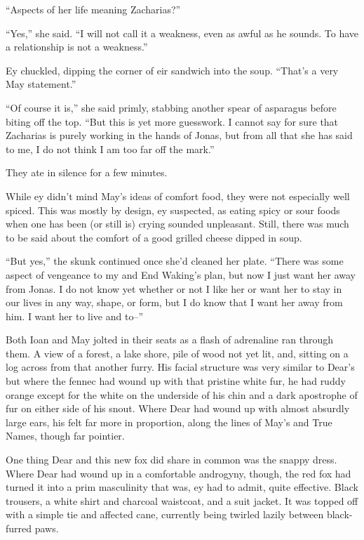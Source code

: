 ``Aspects of her life meaning Zacharias?''

``Yes,'' she said. ``I will not call it a weakness, even as awful as he sounds. To have a relationship is not a weakness.''

Ey chuckled, dipping the corner of eir sandwich into the soup. ``That's a very May statement.''

``Of course it is,'' she said primly, stabbing another spear of asparagus before biting off the top. ``But this is yet more guesswork. I cannot say for sure that Zacharias is purely working in the hands of Jonas, but from all that she has said to me, I do not think I am too far off the mark.''

They ate in silence for a few minutes.

While ey didn't mind May's ideas of comfort food, they were not especially well spiced. This was mostly by design, ey suspected, as eating spicy or sour foods when one has been (or still is) crying sounded unpleasant. Still, there was much to be said about the comfort of a good grilled cheese dipped in soup.

``But yes,'' the skunk continued once she'd cleaned her plate. ``There was some aspect of vengeance to my and End Waking's plan, but now I just want her away from Jonas. I do not know yet whether or not I like her or want her to stay in our lives in any way, shape, or form, but I do know that I want her away from him. I want her to live and to--''

Both Ioan and May jolted in their seats as a flash of adrenaline ran through them. A view of a forest, a lake shore, pile of wood not yet lit, and, sitting on a log across from that another furry. His facial structure was very similar to Dear's but where the fennec had wound up with that pristine white fur, he had ruddy orange except for the white on the underside of his chin and a dark apostrophe of fur on either side of his snout. Where Dear had wound up with almost absurdly large ears, his felt far more in proportion, along the lines of May's and True Names, though far pointier.

One thing Dear and this new fox did share in common was the snappy dress. Where Dear had wound up in a comfortable androgyny, though, the red fox had turned it into a prim masculinity that was, ey had to admit, quite effective. Black trousers, a white shirt and charcoal waistcoat, and a suit jacket. It was topped off with a simple tie and affected cane, currently being twirled lazily between black-furred paws.

